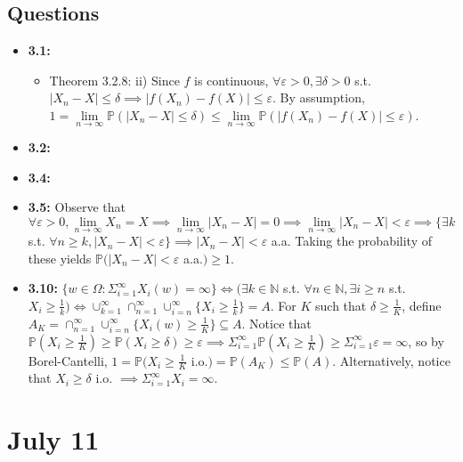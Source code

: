 \documentclass[12pt]{article}
\newcommand{\p}{\mathbb{P}}
\begin{document}
\subsection*{Questions}
\begin{itemize}
    \item \textbf{3.1:}
    \begin{itemize}
        \item Theorem 3.2.8: ii) Since $f$ is continuous, $\forall \varepsilon > 0, \exists \delta > 0$ s.t. $|X_n - X| \leq \delta \implies |f(X_n) - f(X)| \leq \varepsilon$. By assumption, $1 = \lim \limits_{n \to \infty} \p(|X_n - X| \leq \delta) \leq \lim \limits_{n \to \infty} \p(|f(X_n) - f(X)| \leq \varepsilon)$.
    \end{itemize}
    \item \textbf{3.2:}
    \item \textbf{3.4:}
    \item \textbf{3.5:} Observe that $\forall \varepsilon > 0, \lim \limits_{n \to \infty} X_n = X \implies \lim \limits_{n \to \infty} |X_n - X| = 0 \implies \lim \limits_{n \to \infty} |X_n - X| < \varepsilon \implies \{\exists k$ s.t. $\forall n \geq k, |X_n - X| < \varepsilon\} \implies |X_n - X| < \varepsilon$ a.a. Taking the probability of these yields $\p(|X_n - X| < \varepsilon$ a.a.$) \geq 1$.
    \item \textbf{3.10:} $\{w \in \Omega: \Sigma_{i=1}^\infty X_i(w) = \infty\} \iff (\exists k \in \mathbb{N}$ s.t. $\forall n \in \mathbb{N}, \exists i \geq n$ s.t. $X_i \geq \frac{1}{k}) \iff \cup_{k=1}^\infty \cap_{n=1}^\infty \cup_{i=n}^\infty \{X_i \geq \frac{1}{k}\} = A$. For $K$ such that $\delta \geq \frac{1}{K}$, define $A_K = \cap_{n=1}^\infty \cup_{i=n}^\infty \{X_i(w) \geq \frac{1}{K}\} \subseteq A$. Notice that $\p(X_i \geq \frac{1}{K}) \geq \p(X_i \geq \delta) \geq \varepsilon \implies \Sigma_{i=1}^\infty \p(X_i \geq \frac{1}{K}) \geq \Sigma_{i=1}^\infty \varepsilon = \infty$, so by Borel-Cantelli, $1 = \p(X_i \geq \frac{1}{K}$ i.o.$) = \p(A_K) \leq \p(A)$. Alternatively, notice that $X_i \geq \delta$ i.o. $\implies \Sigma_{i=1}^\infty X_i = \infty$.
\end{itemize}

\section*{July 11}
\end{document}
